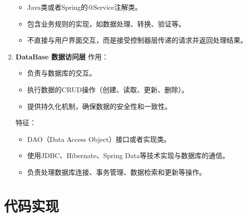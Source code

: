 \documentclass{article}
\begin{document}
\begin{enumerate}
\begin{itemize}
        \item Java类或者Spring的@Service注解类。
        \item 包含业务规则的实现，如数据处理、转换、验证等。
        \item 不直接与用户界面交互，而是接受控制器层传递的请求并返回处理结果。
        \end{itemize}
    \item \textbf{DataBase 数据访问层} \newline
    作用：
        \begin{itemize}
        \item 负责与数据库的交互。
        \item 执行数据的CRUD操作（创建、读取、更新、删除）。
        \item 提供持久化机制，确保数据的安全性和一致性。
        \end{itemize}
    特征：
        \begin{itemize}
        \item DAO（Data Access Object）接口或者实现类。
        \item 使用JDBC、Hibernate、Spring Data等技术实现与数据库的通信。
        \item 负责处理数据库连接、事务管理、数据检索和更新等操作。
        \end{itemize}
\end{enumerate}

\newpage
\section{代码实现}
\end{document}
